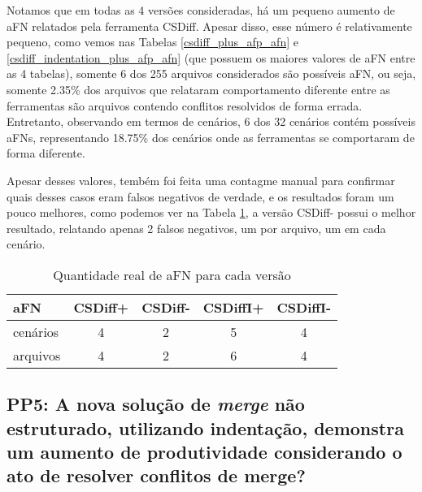 Notamos que em todas as 4 versões consideradas, há um pequeno aumento de aFN relatados pela ferramenta CSDiff. Apesar disso, esse
número é relativamente pequeno, como vemos nas Tabelas \ref{csdiff_plus_afp_afn} e \ref{csdiff_indentation_plus_afp_afn} (que
possuem os maiores valores de aFN entre as 4 tabelas), somente 6 dos 255 arquivos considerados são possíveis aFN, ou seja, somente
2.35\% dos arquivos que relataram comportamento diferente entre as ferramentas são arquivos contendo
conflitos resolvidos de forma errada. Entretanto, observando em termos de cenários, 6 dos 32 cenários contém possíveis aFNs,
representando 18.75\% dos cenários onde as ferramentas se comportaram de forma diferente.

Apesar desses valores, tembém foi feita uma contagme manual para confirmar quais desses casos eram falsos negativos de verdade,
e os resultados foram um pouco melhores, como podemos ver na Tabela \ref{tabela_afn_final}, a versão CSDiff- possui o melhor
resultado, relatando apenas 2 falsos negativos, um por arquivo, um em cada cenário.
\begin{table}[ht]
	\begin{center}
		\begin{tabular}{|l|c|c|c|c|}
			\hline
			\textbf{aFN} & \textbf{CSDiff+} & \textbf{CSDiff-} & \textbf{CSDiffI+} & \textbf{CSDiffI-} \\
			\hline
			cenários     & 4                & 2                & 5                 & 4                 \\
			arquivos     & 4                & 2                & 6                 & 4                 \\
			\hline
		\end{tabular}
	\end{center}
	\caption{Quantidade real de aFN para cada versão}\label{tabela_afn_final}
\end{table}
\subsection{PP5: A nova solução de \emph{merge} não estruturado, utilizando indentação,
	demonstra um aumento de produtividade considerando o ato de resolver conflitos de merge?}

